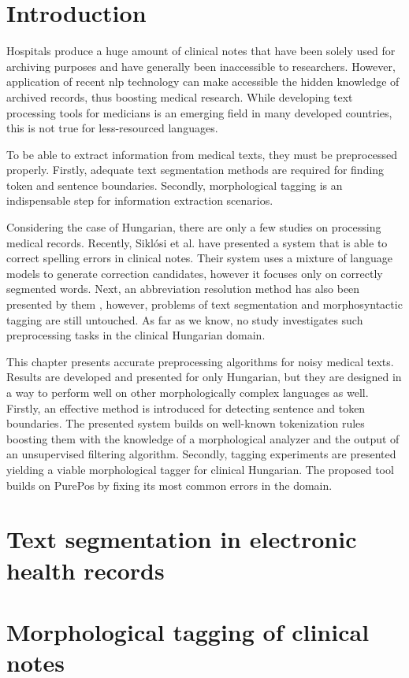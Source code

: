 
\section{Introduction}

Hospitals produce a huge amount of clinical notes that have been solely used for archiving purposes and have generally been inaccessible to researchers. 
However, application of recent \acrshort{nlp} technology can make accessible the hidden knowledge of archived records, thus boosting medical research. 
While developing text processing tools for medicians is an emerging field in many developed countries, this is not true for less-resourced languages.

To be able to extract information from medical texts, they must be preprocessed properly. 
Firstly, adequate text segmentation methods 
are required for finding token and sentence boundaries. 
Secondly, morphological tagging is an indispensable step for information extraction scenarios. 

Considering the case of Hungarian, there are only a few studies on processing medical records. 
Recently, Siklósi et al. \cite{Siklosi2012,Siklosi2013} have presented a system that is able to correct spelling errors in clinical notes. 
Their system uses a mixture of language models to generate correction candidates, however it focuses only on correctly segmented words. 
Next, an abbreviation resolution method has also been presented by them \cite{Siklosi2013b}, however, problems of text segmentation and  morphosyntactic tagging are still untouched. 
As far as we know, no study investigates such preprocessing tasks in the clinical Hungarian domain. 

This chapter presents accurate preprocessing algorithms for noisy medical texts.
Results are developed and presented for only Hungarian, but they are designed in a way to perform well on other morphologically complex languages as well. 
Firstly, an effective method is introduced for detecting sentence and token boundaries.
The presented system builds on well-known tokenization rules boosting them with the knowledge of a morphological analyzer and the output of an unsupervised filtering algorithm.
Secondly, tagging experiments are presented yielding a viable morphological tagger for clinical Hungarian. 
The proposed tool builds on PurePos by fixing its most common errors in the domain.

\section{Text segmentation in electronic health records}\label{sec:clin_segm}


\pagebreak

\section{Morphological tagging of clinical notes}\label{sec:clin_tag}


